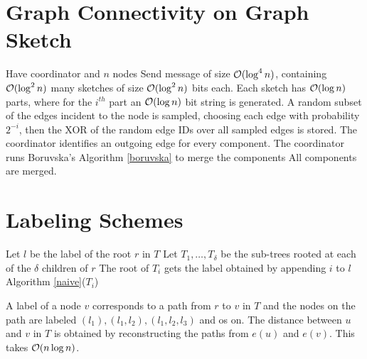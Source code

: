 \documentclass[11pt, oneside]{book}   						%
\begin{document}
\section{Graph Connectivity on Graph Sketch}
\textbf{}
\begin{algorithm}[H]
\caption{}\label{graphconnect}
\begin{algorithmic}[1]
\State Have coordinator and $n$ nodes
\ForEach[node $v$]
	\State Send message of size $\mathcal{O}(\log^4 n)$, containing $\mathcal{O}(\log^2n)$ many sketches of size $\mathcal{O}(\log^2n)$ bits each.
	\State Each sketch has $\mathcal{O}(\log n)$ parts, where for the $i^{th}$ part an $\mathcal{O}(\log n)$ bit string is generated.
	\State A random subset of the edges incident to the node is sampled, choosing each edge with probability $2^{-i}$, then the XOR of the random edge IDs over all sampled edges is stored.
\EndForEach
\Repeat
	\State The coordinator identifies an outgoing edge for every component.
	\State The coordinator runs Boruvska's Algorithm \ref{boruvska} to merge the components
\Until All components are merged.
\end{algorithmic}
\end{algorithm}

\section{Labeling Schemes}
\textbf{}
\begin{algorithm}
\caption{}\label{naive}
\begin{algorithmic}[1]
\State Let $l$ be the label of the root $r$ in $T$
\State Let $T_1, \hdots, T_\delta$ be the sub-trees rooted at each of the $\delta$ children of $r$
	\State The root of $T_i$ gets the label obtained by appending $i$ to $l$
	\State Algorithm \ref{naive}($T_i$)
\EndFor
\end{algorithmic}
\end{algorithm}
\begin{mythm} A label of a node $v$ corresponds to a path from $r$ to $v$ in $T$ and the nodes on the path are labeled $(l_1), (l_1,l_2), (l_1,l_2,l_3)$ and os on. The distance between $u$ and $v$ in $T$ is obtained by reconstructing the paths from $e(u)$ and $e(v)$. This takes $\mathcal{O}(n\log n)$.\end{mythm}
\end{document}
